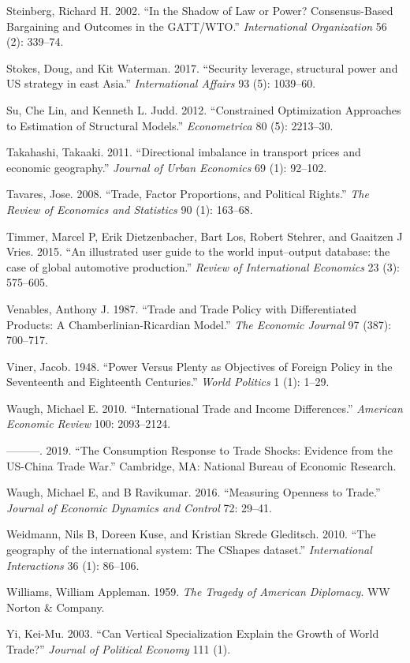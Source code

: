 \documentclass{puthesis}
\newlength{\cslhangindent}
\newenvironment{cslreferences}%
  {\setlength{\parindent}{0pt}%
  \everypar{\setlength{\hangindent}{\cslhangindent}}\ignorespaces}%
  {\par}
\begin{document}
\begin{cslreferences}
\leavevmode\hypertarget{ref-Steinberg2002}{}%
Steinberg, Richard H. 2002. ``In the Shadow of Law or Power?
Consensus-Based Bargaining and Outcomes in the GATT/WTO.''
\emph{International Organization} 56 (2): 339--74.

\leavevmode\hypertarget{ref-Stokes2017}{}%
Stokes, Doug, and Kit Waterman. 2017. ``Security leverage, structural
power and US strategy in east Asia.'' \emph{International Affairs} 93
(5): 1039--60.

\leavevmode\hypertarget{ref-Su2012}{}%
Su, Che Lin, and Kenneth L. Judd. 2012. ``Constrained Optimization
Approaches to Estimation of Structural Models.'' \emph{Econometrica} 80
(5): 2213--30.

\leavevmode\hypertarget{ref-Takahashi2011}{}%
Takahashi, Takaaki. 2011. ``Directional imbalance in transport prices
and economic geography.'' \emph{Journal of Urban Economics} 69 (1):
92--102.

\leavevmode\hypertarget{ref-Tavares2008}{}%
Tavares, Jose. 2008. ``Trade, Factor Proportions, and Political
Rights.'' \emph{The Review of Economics and Statistics} 90 (1): 163--68.

\leavevmode\hypertarget{ref-Timmer2015}{}%
Timmer, Marcel P, Erik Dietzenbacher, Bart Los, Robert Stehrer, and
Gaaitzen J Vries. 2015. ``An illustrated user guide to the world
input--output database: the case of global automotive production.''
\emph{Review of International Economics} 23 (3): 575--605.

\leavevmode\hypertarget{ref-Venables1987}{}%
Venables, Anthony J. 1987. ``Trade and Trade Policy with Differentiated
Products: A Chamberlinian-Ricardian Model.'' \emph{The Economic Journal}
97 (387): 700--717.

\leavevmode\hypertarget{ref-Viner1948}{}%
Viner, Jacob. 1948. ``Power Versus Plenty as Objectives of Foreign
Policy in the Seventeenth and Eighteenth Centuries.'' \emph{World
Politics} 1 (1): 1--29.

\leavevmode\hypertarget{ref-Waugh2010}{}%
Waugh, Michael E. 2010. ``International Trade and Income Differences.''
\emph{American Economic Review} 100: 2093--2124.

\leavevmode\hypertarget{ref-Waugh2019}{}%
---------. 2019. ``The Consumption Response to Trade Shocks: Evidence
from the US-China Trade War.'' Cambridge, MA: National Bureau of
Economic Research.

\leavevmode\hypertarget{ref-Waugh2016}{}%
Waugh, Michael E, and B Ravikumar. 2016. ``Measuring Openness to
Trade.'' \emph{Journal of Economic Dynamics and Control} 72: 29--41.

\leavevmode\hypertarget{ref-Weidmann2010}{}%
Weidmann, Nils B, Doreen Kuse, and Kristian Skrede Gleditsch. 2010.
``The geography of the international system: The CShapes dataset.''
\emph{International Interactions} 36 (1): 86--106.

\leavevmode\hypertarget{ref-Williams1959}{}%
Williams, William Appleman. 1959. \emph{The Tragedy of American
Diplomacy}. WW Norton \& Company.

\leavevmode\hypertarget{ref-Yi2003}{}%
Yi, Kei-Mu. 2003. ``Can Vertical Specialization Explain the Growth of
World Trade?'' \emph{Journal of Political Economy} 111 (1).
\end{cslreferences}
\end{document}
